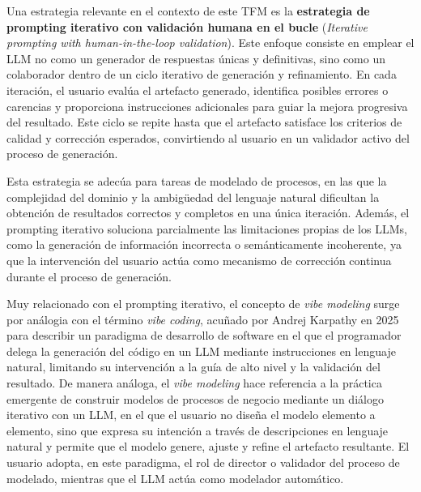 Una estrategia relevante en el contexto de este TFM es la \textbf{estrategia de prompting iterativo con validación humana en el bucle} (\textit{Iterative prompting with human-in-the-loop validation}). Este enfoque consiste en emplear el LLM no como un generador de respuestas únicas y definitivas, sino como un colaborador dentro de un ciclo iterativo de generación y refinamiento. En cada iteración, el usuario evalúa el artefacto generado, identifica posibles errores o carencias y proporciona instrucciones adicionales para guiar la mejora progresiva del resultado. Este ciclo se repite hasta que el artefacto satisface los criterios de calidad y corrección esperados, convirtiendo al usuario en un validador activo del proceso de generación.


Esta estrategia se adecúa para tareas de modelado de procesos, en las que la complejidad del dominio y la ambigüedad del lenguaje natural dificultan la obtención de resultados correctos y completos en una única iteración. Además, el prompting iterativo soluciona parcialmente las limitaciones propias de los LLMs, como la generación de información incorrecta o semánticamente incoherente, ya que la intervención del usuario actúa como mecanismo de corrección continua durante el proceso de generación. 

Muy relacionado con el prompting iterativo, el concepto de \textit{vibe modeling} surge por análogia con el término \textit{vibe coding}, acuñado por Andrej Karpathy en 2025
para describir un paradigma de desarrollo de software en el que el programador delega la generación del código en un LLM mediante instrucciones en lenguaje natural, limitando su intervención a la guía de alto nivel y la validación del resultado. De manera análoga, el \textit{vibe modeling} hace referencia a la práctica emergente de construir modelos de procesos de negocio mediante un diálogo iterativo con un LLM, en el que el usuario no diseña el modelo elemento a elemento, sino que expresa su intención a través de descripciones en lenguaje natural y permite que el modelo genere, ajuste y refine el artefacto resultante. El usuario adopta, en este paradigma, el rol de director o validador del proceso de modelado, mientras que el LLM actúa como modelador automático.


